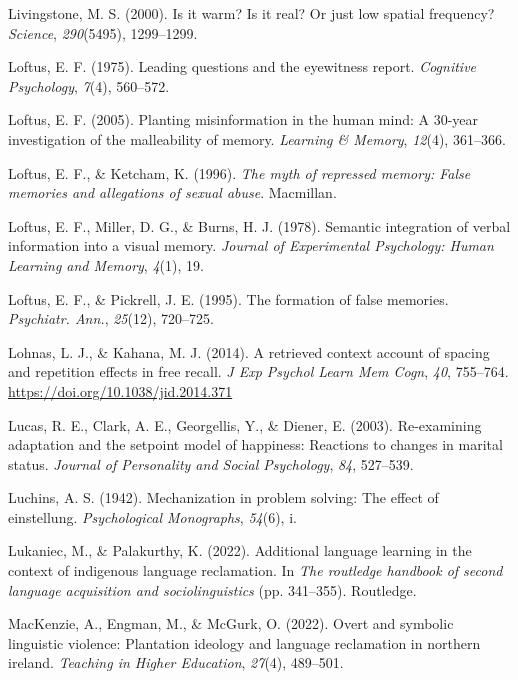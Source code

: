 \documentclass[
]{krantz}
\newlength{\cslhangindent}
\newenvironment{CSLReferences}[2] %
 {\begin{list}{}{%
  \setlength{\itemindent}{0pt}
  \setlength{\leftmargin}{0pt}
  \setlength{\parsep}{0pt}
  \ifodd #1
   \setlength{\leftmargin}{\cslhangindent}
   \setlength{\itemindent}{-1\cslhangindent}
  \fi
  \setlength{\itemsep}{#2\baselineskip}}}
 {\end{list}}
\begin{document}
\begin{CSLReferences}{1}{0}
Livingstone, M. S. (2000). Is it warm? Is it real? Or just low spatial frequency? \emph{Science}, \emph{290}(5495), 1299--1299.

Loftus, E. F. (1975). Leading questions and the eyewitness report. \emph{Cognitive Psychology}, \emph{7}(4), 560--572.

Loftus, E. F. (2005). Planting misinformation in the human mind: A 30-year investigation of the malleability of memory. \emph{Learning \& Memory}, \emph{12}(4), 361--366.

Loftus, E. F., \& Ketcham, K. (1996). \emph{The myth of repressed memory: False memories and allegations of sexual abuse}. Macmillan.

Loftus, E. F., Miller, D. G., \& Burns, H. J. (1978). Semantic integration of verbal information into a visual memory. \emph{Journal of Experimental Psychology: Human Learning and Memory}, \emph{4}(1), 19.

Loftus, E. F., \& Pickrell, J. E. (1995). The formation of false memories. \emph{Psychiatr. Ann.}, \emph{25}(12), 720--725.

Lohnas, L. J., \& Kahana, M. J. (2014). A retrieved context account of spacing and repetition effects in free recall. \emph{J Exp Psychol Learn Mem Cogn}, \emph{40}, 755--764. \url{https://doi.org/10.1038/jid.2014.371}

Lucas, R. E., Clark, A. E., Georgellis, Y., \& Diener, E. (2003). Re-examining adaptation and the setpoint model of happiness: Reactions to changes in marital status. \emph{Journal of Personality and Social Psychology}, \emph{84}, 527--539.

Luchins, A. S. (1942). Mechanization in problem solving: The effect of einstellung. \emph{Psychological Monographs}, \emph{54}(6), i.

Lukaniec, M., \& Palakurthy, K. (2022). Additional language learning in the context of indigenous language reclamation. In \emph{The routledge handbook of second language acquisition and sociolinguistics} (pp. 341--355). Routledge.

MacKenzie, A., Engman, M., \& McGurk, O. (2022). Overt and symbolic linguistic violence: Plantation ideology and language reclamation in northern ireland. \emph{Teaching in Higher Education}, \emph{27}(4), 489--501.


\end{CSLReferences}
\end{document}

